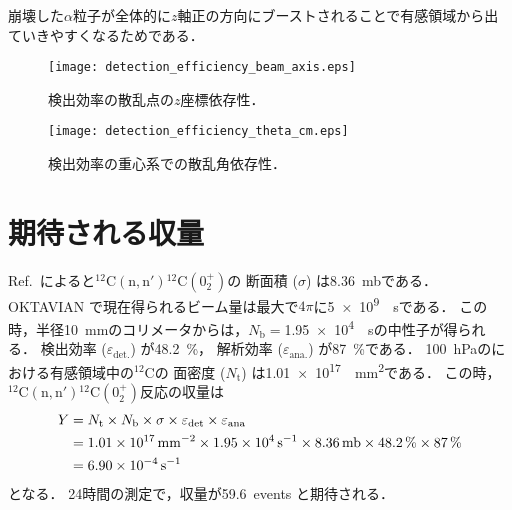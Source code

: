 \documentclass[../master]{subfiles}
\begin{document}
崩壊した$\alpha$粒子が全体的に$z$軸正の方向にブーストされることで有感領域から出ていきやすくなるためである．
\begin{figure}
  \centering
  \texttt{[image: detection\_efficiency\_beam\_axis.eps]}
  \caption{検出効率の散乱点の$z$座標依存性．}
  \label{fig::detection_efficiency_beam_axis}
\end{figure}
\begin{figure}
  \centering
  \texttt{[image: detection\_efficiency\_theta\_cm.eps]}
  \caption{検出効率の重心系での散乱角依存性．}
  \label{fig::detection_efficiency_theta_cm}
\end{figure}

\section{期待される収量}
Ref.~\cite{takahashietal,kondoetal}によると${}^{12}\mathrm{C}(\mathrm{n},\mathrm{n}'){}^{12}\mathrm{C}(0_{2}^{+})$の
断面積 ($\sigma$) は\SI{8.36}{\milli\barn}である．
OKTAVIAN で現在得られるビーム量は最大で$4\pi$に\SI{5e9}{\per\second}である．
この時，半径\SI{10}{\milli\metre}のコリメータからは，$N_{\text{b}}=$\SI{1.95e4}{\per\second}の中性子が得られる．
検出効率 ($\varepsilon_{\text{det.}}$) が\SI{48.2}{\percent}，
解析効率 ($\varepsilon_{\text{ana.}}$) が\SI{87}{\percent}である．
\SI{100}{\hecto\pascal}の\isoButaneHydro における有感領域中の${}^{12}\mathrm{C}$の
面密度 ($N_{\text{t}}$) は\SI{1.01e17}{\per\square\milli\metre}である．
この時，${}^{12}\mathrm{C}(\mathrm{n},\mathrm{n}'){}^{12}\mathrm{C}(0_{2}^{+})$反応の収量は
\begin{align}
  Y &= N_{\text{t}}\times N_{\text{b}}\times \sigma \times\varepsilon_{\text{det}}\times\varepsilon_{\text{ana}} \notag\\
  &= \SI{1.01e17}{\per\square\milli\metre}\times\SI{1.95e4}{\per\second}\times\SI{8.36}{\milli\barn}
  \times\SI{48.2}{\percent}\times\SI{87}{\percent} \notag\\
  &= \SI{6.90e-4}{\per\second}
\end{align}
となる．
24時間の測定で，収量が59.6~events と期待される．
\end{document}
